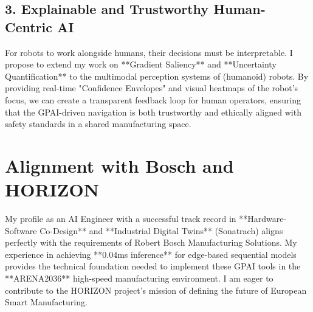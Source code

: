 \documentclass[11pt,a4paper]{article}
\begin{document}
\subsection{3. Explainable and Trustworthy Human-Centric AI}
For robots to work alongside humans, their decisions must be interpretable. I propose to extend my work on **Gradient Saliency** and **Uncertainty Quantification** to the multimodal perception systems of (humanoid) robots. By providing real-time "Confidence Envelopes" and visual heatmaps of the robot's focus, we can create a transparent feedback loop for human operators, ensuring that the GPAI-driven navigation is both trustworthy and ethically aligned with safety standards in a shared manufacturing space.

\section{Alignment with Bosch and HORIZON}
My profile as an AI Engineer with a successful track record in **Hardware-Software Co-Design** and **Industrial Digital Twins** (Sonatrach) aligns perfectly with the requirements of Robert Bosch Manufacturing Solutions. My experience in achieving **0.04ms inference** for edge-based sequential models provides the technical foundation needed to implement these GPAI tools in the **ARENA2036** high-speed manufacturing environment. I am eager to contribute to the HORIZON project’s mission of defining the future of European Smart Manufacturing.
\end{document}
